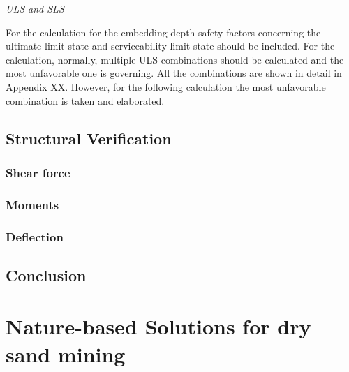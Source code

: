 \textit{ULS and SLS}

For the calculation for the embedding depth safety factors concerning the ultimate limit state and serviceability limit state should be included. For the calculation, normally, multiple ULS combinations should be calculated and the most unfavorable one is governing. All the combinations are shown in detail in Appendix XX. However, for the following calculation the most unfavorable combination is taken and elaborated.


\subsection{Structural Verification}

\subsubsection{Shear force}

\subsubsection{Moments}

\subsubsection{Deflection}

\subsection{Conclusion}

\newpage

\section{Nature-based Solutions for dry sand mining}


